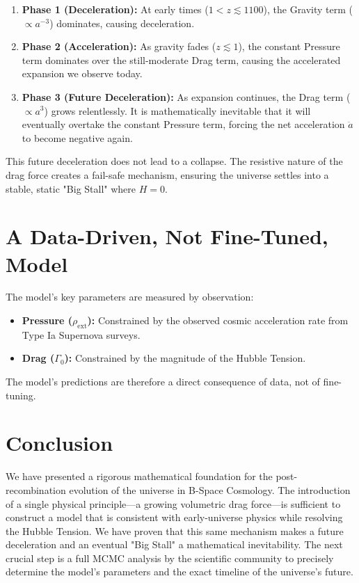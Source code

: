 \documentclass{BSpacePaper} %
\begin{document}
\begin{enumerate}
    \item \textbf{Phase 1 (Deceleration):} At early times ($1 < z \lesssim 1100$), the Gravity term ($\propto a^{-3}$) dominates, causing deceleration.
    \item \textbf{Phase 2 (Acceleration):} As gravity fades ($z \lesssim 1$), the constant Pressure term dominates over the still-moderate Drag term, causing the accelerated expansion we observe today.
    \item \textbf{Phase 3 (Future Deceleration):} As expansion continues, the Drag term ($\propto a^3$) grows relentlessly. It is mathematically inevitable that it will eventually overtake the constant Pressure term, forcing the net acceleration $\ddot{a}$ to become negative again.
\end{enumerate}

This future deceleration does not lead to a collapse. The resistive nature of the drag force creates a fail-safe mechanism, ensuring the universe settles into a stable, static "Big Stall" where $H=0$.

\section{A Data-Driven, Not Fine-Tuned, Model}
The model's key parameters are measured by observation:
\begin{itemize}
    \item \textbf{Pressure ($\rho_{\text{ext}}$):} Constrained by the observed cosmic acceleration rate from Type Ia Supernova surveys.
    \item \textbf{Drag ($\Gamma_0$):} Constrained by the magnitude of the Hubble Tension.
\end{itemize}
The model's predictions are therefore a direct consequence of data, not of fine-tuning.

\section{Conclusion}
We have presented a rigorous mathematical foundation for the post-recombination evolution of the universe in B-Space Cosmology. The introduction of a single physical principle—a growing volumetric drag force—is sufficient to construct a model that is consistent with early-universe physics while resolving the Hubble Tension. We have proven that this same mechanism makes a future deceleration and an eventual "Big Stall" a mathematical inevitability. The next crucial step is a full MCMC analysis by the scientific community to precisely determine the model's parameters and the exact timeline of the universe's future.
\end{document}
